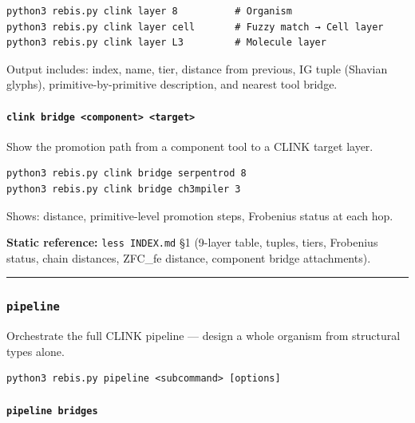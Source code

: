 \documentclass[12pt,a4paper]{article}
\begin{document}
\begin{verbatim}
python3 rebis.py clink layer 8          # Organism
python3 rebis.py clink layer cell       # Fuzzy match → Cell layer
python3 rebis.py clink layer L3         # Molecule layer
\end{verbatim}

Output includes: index, name, tier, distance from previous, IG tuple
(Shavian glyphs), primitive-by-primitive description, and nearest tool
bridge.

\hypertarget{clink-bridge-component-target}{%
\paragraph{\texorpdfstring{\texttt{clink\ bridge\ \textless{}component\textgreater{}\ \textless{}target\textgreater{}}}{clink bridge \textless component\textgreater{} \textless target\textgreater{}}}\label{clink-bridge-component-target}}

Show the promotion path from a component tool to a CLINK target layer.

\begin{verbatim}
python3 rebis.py clink bridge serpentrod 8
python3 rebis.py clink bridge ch3mpiler 3
\end{verbatim}

Shows: distance, primitive-level promotion steps, Frobenius status at
each hop.

\textbf{Static reference:} \texttt{less\ INDEX.md} §1 (9-layer table,
tuples, tiers, Frobenius status, chain distances, ZFC\_fe distance,
component bridge attachments).

\begin{center}\rule{0.5\linewidth}{0.5pt}\end{center}

\hypertarget{pipeline}{%
\subsubsection{\texorpdfstring{\texttt{pipeline}}{pipeline}}\label{pipeline}}

Orchestrate the full CLINK pipeline --- design a whole organism from
structural types alone.

\begin{verbatim}
python3 rebis.py pipeline <subcommand> [options]
\end{verbatim}

\hypertarget{pipeline-bridges}{%
\paragraph{\texorpdfstring{\texttt{pipeline\ bridges}}{pipeline bridges}}\label{pipeline-bridges}}
\end{document}
